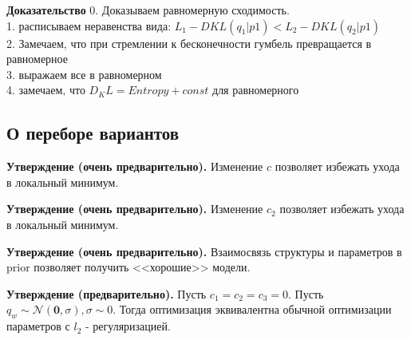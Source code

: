 \textbf{Доказательство}
0. Доказываем равномерную сходимость.\\
1. расписываем неравенства вида: $L_1 - DKL(q_1|p1) <L_2 - DKL(q_2|p1)$\\
2. Замечаем, что при стремлении к бесконечности гумбель превращается в равномерное\\
3. выражаем все в равномерном\\
4. замечаем, что $D_KL = Entropy + const$ для равномерного




\subsection{О переборе вариантов}


\textbf{Утверждение (очень предварительно).} Изменение $c$ позволяет избежать ухода в локальный минимум. 

\textbf{Утверждение (очень предварительно).} Изменение $c_2$ позволяет избежать ухода в локальный минимум.

\textbf{Утверждение (очень предварительно).} Взаимосвязь структуры и параметров в prior позволяет получить <<хорошие>> модели.

\textbf{Утверждение (предварительно).} Пусть $c_1 = c_2 = c_3 = 0$. Пусть $q_w \sim \mathcal{N}(\mathbf{0}, \sigma), \sigma \sim 0$. 
Тогда оптимизация эквивалентна обычной оптимизации параметров с $l_2$ - регуляризацией.


